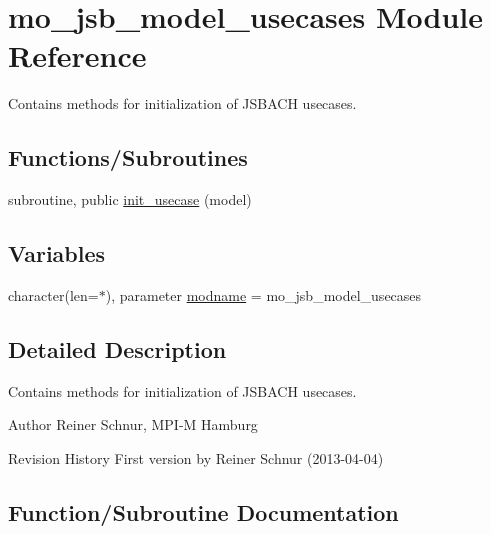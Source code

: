 \hypertarget{namespacemo__jsb__model__usecases}{}\section{mo\+\_\+jsb\+\_\+model\+\_\+usecases Module Reference}
\label{namespacemo__jsb__model__usecases}


Contains methods for initialization of J\+S\+B\+A\+C\+H usecases.  


\subsection*{Functions/\+Subroutines}
\begin{DoxyCompactItemize}
\item 
subroutine, public \hyperlink{namespacemo__jsb__model__usecases_aee8b30e4af60fbe54276c99ea4ee1fd1}{init\+\_\+usecase} (model)
\end{DoxyCompactItemize}
\subsection*{Variables}
\begin{DoxyCompactItemize}
\item 
character(len=$\ast$), parameter \hyperlink{namespacemo__jsb__model__usecases_a6402d6a009193765fce1700ae3c98365}{modname} = \textquotesingle{}mo\+\_\+jsb\+\_\+model\+\_\+usecases\textquotesingle{}
\end{DoxyCompactItemize}


\subsection{Detailed Description}
Contains methods for initialization of J\+S\+B\+A\+C\+H usecases. 

\begin{DoxyAuthor}{Author}
Reiner Schnur, M\+P\+I-\/\+M Hamburg
\end{DoxyAuthor}
\begin{DoxyParagraph}{Revision History}
First version by Reiner Schnur (2013-\/04-\/04) 
\end{DoxyParagraph}


\subsection{Function/\+Subroutine Documentation}
\hypertarget{namespacemo__jsb__model__usecases_aee8b30e4af60fbe54276c99ea4ee1fd1}{}
